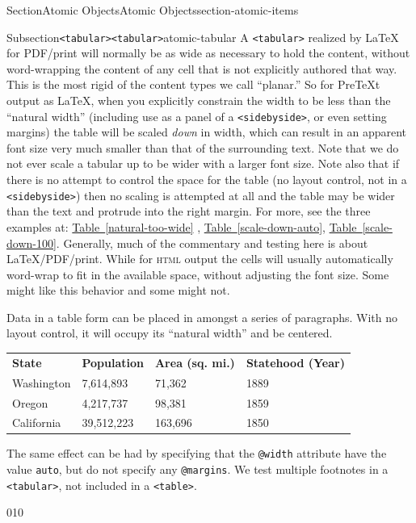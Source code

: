 \documentclass[twoside,10pt,]{article}
\newcommand{\tabularfont}{\relax}
\newcommand{\xreffont}{\relax}
\newcommand{\mono}[1]{\texttt{#1}}
\newcommand{\initialism}[1]{\textsc{\MakeLowercase{#1}}}
\numberwithin{equation}{section}
\begin{document}
\begin{sectionptx}{Section}{Atomic Objects}{}{Atomic Objects}{}{}{section-atomic-items}
\begin{subsectionptx}{Subsection}{\mono{<tabular>}}{}{\mono{<tabular>}}{}{}{atomic-tabular}
A \mono{<tabular>} realized by \LaTeX{} for PDF\slash{}print will normally be as wide as necessary to hold the content, without word-wrapping the content of any cell that is not explicitly authored that way.  This is the most rigid of the content types we call ``planar.''  So for PreTeXt output as \LaTeX{}, when you explicitly constrain the width to be less than the ``natural width'' (including use as a panel of a \mono{<sidebyside>}, or even setting margins) the table will be scaled \emph{down} in width, which can result in an apparent font size very much smaller than that of the surrounding text.  Note that we do not ever scale a tabular up to be wider with a larger font size.  Note also that if there is no attempt to control the space for the table (no layout control, not in a \mono{<sidebyside>}) then no scaling is attempted at all and the table may be wider than the text and protrude into the right margin.  For more, see the three examples at: \hyperref[natural-too-wide]{Table~{\xreffont\ref{natural-too-wide}}} , \hyperref[scale-down-auto]{Table~{\xreffont\ref{scale-down-auto}}}, \hyperref[scale-down-100]{Table~{\xreffont\ref{scale-down-100}}}.  Generally, much of the commentary and testing here is about \LaTeX{}\slash{}PDF\slash{}print.  While for \initialism{HTML} output the cells will usually automatically word-wrap to fit in the available space, without adjusting the font size.  Some might like this behavior and some might not.%
\par
Data in a table form can be placed in amongst a series of paragraphs.  With no layout control, it will occupy its ``natural width'' and be centered.%
\begin{center}%
{\tabularfont%
\begin{tabular}{llll}
{\bfseries{}State}&{\bfseries{}Population}&{\bfseries{}Area (sq. mi.)}&{\bfseries{}Statehood (Year)}\tabularnewline[0pt]
Washington&7,614,893&71,362&1889\tabularnewline[0pt]
Oregon&4,217,737&98,381&1859\tabularnewline[0pt]
California&39,512,223&163,696&1850
\end{tabular}
}%
\end{center}%
The same effect can be had by specifying that the \mono{@width} attribute have the value \mono{auto}, but do not specify any \mono{@margins}.  We test multiple footnotes in a \mono{<tabular>}, not included in a \mono{<table>}.%
\begin{tabularbox}{0}{1}{0}%
\resizebox{\ifdim\width > \linewidth\linewidth\else\width\fi}{!}{%
{\tabularfont%
\begin{tabular}{llll}

\end{tabular}}}
\end{tabularbox}
\end{subsectionptx}
\end{sectionptx}
\end{document}
